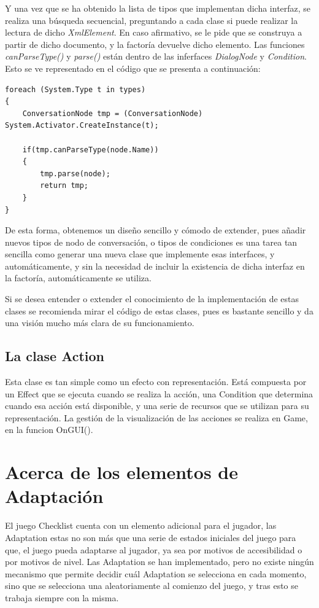 Y una vez que se ha obtenido la lista de tipos que implementan dicha interfaz, se realiza una búsqueda secuencial, preguntando a cada clase si puede realizar la lectura de dicho \textit{XmlElement}. En caso afirmativo, se le pide que se construya a partir de dicho documento, y la factoría devuelve dicho elemento. Las funciones \textit{canParseType()} y \textit{parse()} están dentro de las inferfaces \textit{DialogNode} y \textit{Condition}. Esto se ve representado en el código que se presenta a continuación:

\begin{lstlisting}
foreach (System.Type t in types)
{
	ConversationNode tmp = (ConversationNode) System.Activator.CreateInstance(t);
	
	if(tmp.canParseType(node.Name))
	{
		tmp.parse(node);
		return tmp;
	}
}
\end{lstlisting}


De esta forma, obtenemos un diseño sencillo y cómodo de extender, pues añadir nuevos tipos de nodo de conversación, o tipos de condiciones es una tarea tan sencilla como generar una nueva clase que implemente esas interfaces, y automáticamente, y sin la necesidad de incluir la existencia de dicha interfaz en la factoría, automáticamente se utiliza.

Si se desea entender o extender el conocimiento de la implementación de estas clases se recomienda mirar el código de estas clases, pues es bastante sencillo y da una visión mucho más clara de su funcionamiento.

\subsection{La clase Action}

Esta clase es tan simple como un efecto con representación. Está compuesta por un Effect que se ejecuta cuando se realiza la acción, una Condition que determina cuando esa acción está disponible, y una serie de recursos que se utilizan para su representación.
La gestión de la visualización de las acciones se realiza en Game, en la funcion OnGUI().

\section{Acerca de los elementos de Adaptación}

El juego Checklist cuenta con un elemento adicional para el jugador, las Adaptation estas no son más que una serie de estados iniciales del juego para que, el juego pueda adaptarse al jugador, ya sea por motivos de accesibilidad o por motivos de nivel.
Las Adaptation se han implementado, pero no existe ningún mecanismo que permite decidir cuál Adaptation se selecciona en cada momento, sino que se selecciona una aleatoriamente al comienzo del juego, y tras esto se trabaja siempre con la misma.

